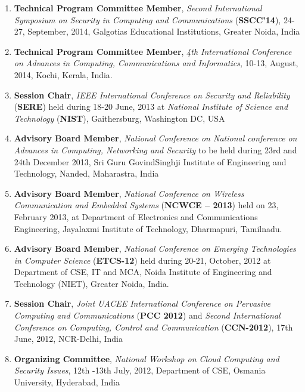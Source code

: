 \begin{enumerate}
\item
\textbf{Technical Program Committee Member},\textit{ Second International Symposium on Security in Computing and Communications} (\textbf{SSCC’14}), 24-27, September, 2014, Galgotias Educational Institutions, Greater Noida, India

\item
\textbf{Technical Program Committee Member}, \textit{4th International Conference on Advances in Computing, Communications and Informatics}, 10-13, August, 2014, Kochi, Kerala, India.

\item
\textbf{Session Chair}, \textit{IEEE International Conference on Security and Reliability} (\textbf{SERE}) held during 18-20 June, 2013 at\textit{ National Institute of Science and Technology} (\textbf{NIST}), Gaithersburg, Washington DC, USA

\item
\textbf{Advisory Board Member}, \textit{National Conference on National conference on Advances in Computing, Networking and Security} to be held during 23rd and 24th December 2013, Sri Guru GovindSinghji Institute of Engineering and Technology, Nanded, Maharastra, India

\item
\textbf{Advisory Board Member}, \textit{National Conference on Wireless Communication and Embedded Systems} (\textbf{NCWCE – 2013}) held on 23, February 2013, at Department of Electronics and Communications Engineering, Jayalaxmi Institute of Technology, Dharmapuri, Tamilnadu. 

\item
\textbf{Advisory Board Member}, \textit{National Conference on Emerging Technologies in Computer Science}  (\textbf{ETCS-12})  held during 20-21, October, 2012 at Department of CSE, IT and MCA, Noida Institute of Engineering and Technology (NIET), Greater Noida, India.

\item
\textbf{Session Chair},\textit{ Joint UACEE International Conference on Pervasive Computing and Communications} (\textbf{PCC 2012}) and \textit{Second International Conference on Computing, Control and Communication }(\textbf{CCN-2012}), 17th June, 2012, NCR-Delhi, India

\item
\textbf{Organizing Committee}, \textit{National Workshop on Cloud Computing and Security Issues}, 12th -13th July, 2012, Department of CSE, Osmania University, Hyderabad, India


\end{enumerate}
